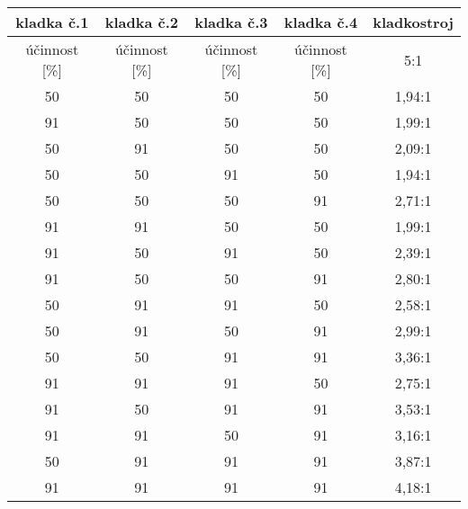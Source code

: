 \begin{table}[h!]
    \begin{tabular}{|c|c|c|c|c|}
        \hline
        kladka č.1 & kladka č.2 & kladka č.3 & kladka č.4 & kladkostroj \\ \hline
        {účinnost [}\%{]}   & {účinnost [}\%{]}   & {účinnost [}\%{]}   & {účinnost [}\%{]}   & 5:1         \\ \hline
        50                  & 50                  & 50                  & 50                  & 1,94:1      \\ \hline
        91                  & 50                  & 50                  & 50                  & 1,99:1      \\ \hline
        50                  & 91                  & 50                  & 50                  & 2,09:1      \\ \hline
        50                  & 50                  & 91                  & 50                  & 1,94:1      \\ \hline
        50                  & 50                  & 50                  & 91                  & 2,71:1      \\ \hline
        91                  & 91                  & 50                  & 50                  & 1,99:1      \\ \hline
        91                  & 50                  & 91                  & 50                  & 2,39:1      \\ \hline
        91                  & 50                  & 50                  & 91                  & 2,80:1      \\ \hline
        50                  & 91                  & 91                  & 50                  & 2,58:1      \\ \hline
        50                  & 91                  & 50                  & 91                  & 2,99:1      \\ \hline
        50                  & 50                  & 91                  & 91                  & 3,36:1      \\ \hline
        91                  & 91                  & 91                  & 50                  & 2,75:1      \\ \hline
        91                  & 50                  & 91                  & 91                  & 3,53:1      \\ \hline
        91                  & 91                  & 50                  & 91                  & 3,16:1      \\ \hline
        50                  & 91                  & 91                  & 91                  & 3,87:1      \\ \hline
        91                  & 91                  & 91                  & 91                  & 4,18:1      \\ \hline
    \end{tabular}
\end{table}
\newpage
